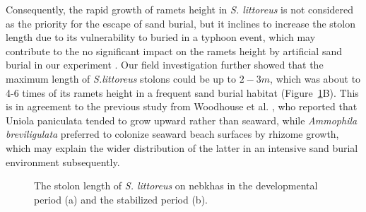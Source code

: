 \documentclass[]{interact}
\theoremstyle{plain}%
\theoremstyle{definition}
\theoremstyle{remark}
\begin{document}
Consequently, the rapid growth of ramets height in \textit{S. littoreus} is not considered as the priority for the escape of sand burial, but it inclines to increase the stolon length due to its vulnerability to buried in a typhoon event, which may contribute to the no significant impact on the ramets height by artificial sand burial in our experiment \citep{maunAdaptationsEnhancingSurvival1994}. Our field investigation further showed that the maximum length of \textit{S.littoreus} stolons could be up to $2-3 m$, which was about to 4-6 times of its ramets height in a frequent sand burial habitat (Figure~\ref{fig:added}B). This is in agreement to the previous study from Woodhouse et al. \citeyear{woodhouseEffectSpeciesDune1977}, who reported that Uniola paniculata tended to grow upward rather than seaward, while \textit{Ammophila breviligulata} preferred to colonize seaward beach surfaces by rhizome growth, which may explain the wider distribution of the latter in an intensive sand burial environment subsequently. 

\begin{figure}[!h]
  \centering
  \hspace{5pt}
  \caption{The stolon length of \textit{S. littoreus} on nebkhas in the developmental period (a) and the stabilized period (b).} 
  \label{fig:added}
\end{figure}
\end{document}
